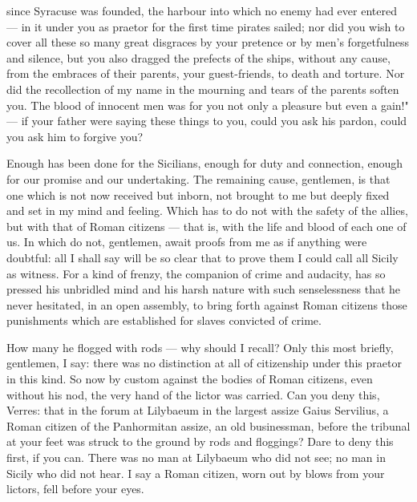  since Syracuse was founded, the harbour into which no enemy had ever entered --- in it under you as praetor for the first time pirates sailed; nor did you wish to cover all these so many great disgraces by your pretence or by men's forgetfulness and silence, but you also dragged the prefects of the ships, without any cause, from the embraces of their parents, your guest-friends, to death and torture. Nor did the recollection of my name in the mourning and tears of the parents soften you. The blood of innocent men was for you not only a pleasure but even a gain!" --- if your father were saying these things to you, could you ask his pardon, could you ask him to forgive you?

 Enough has been done for the Sicilians, enough for duty and connection, enough for our promise and our undertaking. The remaining cause, gentlemen, is that one which is not now received but inborn, not brought to me but deeply fixed and set in my mind and feeling. Which has to do not with the safety of the allies, but with that of Roman citizens --- that is, with the life and blood of each one of us. In which do not, gentlemen, await proofs from me as if anything were doubtful: all I shall say will be so clear that to prove them I could call all Sicily as witness. For a kind of frenzy, the companion of crime and audacity, has so pressed his unbridled mind and his harsh nature with such senselessness that he never hesitated, in an open assembly, to bring forth against Roman citizens those punishments which are established for slaves convicted of crime.

 How many he flogged with rods --- why should I recall? Only this most briefly, gentlemen, I say: there was no distinction at all of citizenship under this praetor in this kind. So now by custom against the bodies of Roman citizens, even without his nod, the very hand of the lictor was carried. Can you deny this, Verres: that in the forum at Lilybaeum in the largest assize Gaius Servilius, a Roman citizen of the Panhormitan assize, an old businessman, before the tribunal at your feet was struck to the ground by rods and floggings? Dare to deny this first, if you can. There was no man at Lilybaeum who did not see; no man in Sicily who did not hear. I say a Roman citizen, worn out by blows from your lictors, fell before your eyes.

